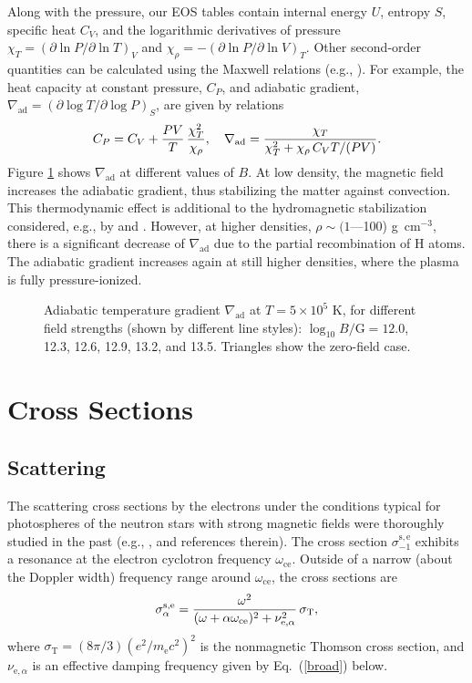 \documentclass{emulateapj}
\newcommand{\gcc}{\mbox{g cm$^{-3}$}}
\newcommand{\beq}{\begin{equation}}
\newcommand{\eeq}{\end{equation}}
\newcommand{\req}[1]{Eq.\ (\ref{#1})}
\newcommand{\mel}{m_\mathrm{e}}
\newcommand{\omc}{\omega_\mathrm{ce}}
\begin{document}
Along with the pressure, our EOS tables contain internal energy $U$,
entropy $S$, specific heat $C_V$, and
the logarithmic derivatives of pressure  
$\chi_T=(\partial\ln P/\partial\ln T)_V$
and
   $\chi_\rho=-(\partial\ln P/\partial\ln V)_T$.
Other second-order quantities
can be calculated using the Maxwell relations
(e.g., \citealp{LaLi-stat1}).
For example, the heat capacity at constant pressure, $C_P$,
and adiabatic gradient, 
$\nabla_\mathrm{ad}=(\partial\log T/\partial\log P)_S$,
are given by relations
\beq
   C_P = C_V+ { PV \over T } \, {\chi_T^2\over\chi_\rho},
\quad
   \nabla_\mathrm{ad} =
        { \chi_T \over \chi_T^2 + \chi_\rho\, C_V T /(PV) }.
\label{tegrad1}
\eeq
Figure \ref{fig-tegrad} shows $\nabla_\mathrm{ad}$
at different values of $B$. At low density, 
the magnetic field increases the adiabatic gradient,
thus stabilizing the matter against convection.
This thermodynamic effect is additional to the hydromagnetic stabilization 
considered, e.g., by \citet{Chandra-hydromagnetic}
and \citet{Miralles}.
However, at higher densities, $\rho\sim (1$---100) \gcc,
there is a significant decrease of $\nabla_\mathrm{ad}$
due to the partial recombination of H atoms. 
The adiabatic gradient increases again at still higher densities,
where the plasma is fully pressure-ionized.

\begin{figure}
\caption{Adiabatic temperature gradient 
$\nabla_\mathrm{ad}$ at $T=5\times10^5$ K,
for different field strengths (shown by different line styles):
$\log_{10}B/\mathrm{G} = 12.0$, 12.3, 12.6, 12.9, 13.2, and 13.5.
Triangles show the zero-field case.
\label{fig-tegrad}}
\end{figure}

       \section{Cross Sections}
\label{sect-cross}
\subsection{Scattering}

The scattering cross sections by the electrons under the conditions
typical for photospheres of the neutron stars with strong magnetic
fields were thoroughly studied in the past
 (e.g., \citealp{Ventura79,Kam82,Mesz}, and references therein).
The cross section $\sigma_{-1}^\mathrm{s,e}$
exhibits a resonance
at the electron cyclotron frequency $\omc$.
Outside of a narrow (about the Doppler width) frequency range 
around $\omc$, the cross sections are
\beq
    \sigma_\alpha^\mathrm{s,e} =
          {\omega^2\over(\omega+\alpha\omc)^2
             +\nu_{\mathrm{e},\alpha}^2}\, \sigma_\mathrm{T},
\label{sigma-se}
\eeq
where $\sigma_\mathrm{T}=(8\pi/3)(e^2/\mel c^2)^2$
is the nonmagnetic Thomson cross section, and
$\nu_{\mathrm{e},\alpha}$ is an effective damping frequency
given by \req{broad} below.
\end{document}
